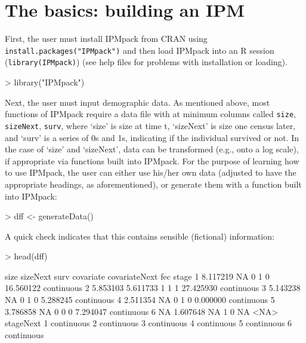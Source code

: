 \documentclass{article}
\begin{document}
\section{The basics: building an IPM}

First, the user must install IPMpack from CRAN using
{\tt install.packages("IPMpack")} and then load IPMpack into an R session
({\tt library(IPMpack)}) (see help files for problems with installation or loading). 

\begin{Schunk}
\begin{Sinput}
> library("IPMpack")
\end{Sinput}
\end{Schunk}
Next, the user must input demographic data. As mentioned above, most functions of IPMpack require a data file with at minimum columns called {\tt size}, {\tt sizeNext}, {\tt surv}, where `size' is size at time t, `sizeNext' is size one census later, and `surv' is a series of 0s and 1s, indicating if the individual survived or not. In the case of `size' and `sizeNext', data can be transformed (e.g., onto a log scale), if appropriate via functions built into IPMpack. For the purpose of learning how to use IPMpack, the user can either use his/her own data (adjusted to have the appropriate headings, as aforementioned), or generate them with a function built into IPMpack:

\begin{Schunk}
\begin{Sinput}
> dff <- generateData()
\end{Sinput}
\end{Schunk}
A quick check indicates that this contains sensible (fictional) information: 
\begin{Schunk}
\begin{Sinput}
> head(dff)
\end{Sinput}
\begin{Soutput}
      size sizeNext surv covariate covariateNext       fec      stage
1 8.117219       NA    0         1             0 16.560122 continuous
2 5.853103 5.611733    1         1             1 27.425930 continuous
3 5.143238       NA    0         1             0  5.288245 continuous
4 2.511354       NA    0         1             0  0.000000 continuous
5 3.786858       NA    0         0             0  7.294047 continuous
6       NA 1.607648   NA         1             0        NA       <NA>
   stageNext
1 continuous
2 continuous
3 continuous
4 continuous
5 continuous
6 continuous
\end{Soutput}
\end{Schunk}
\end{document}
